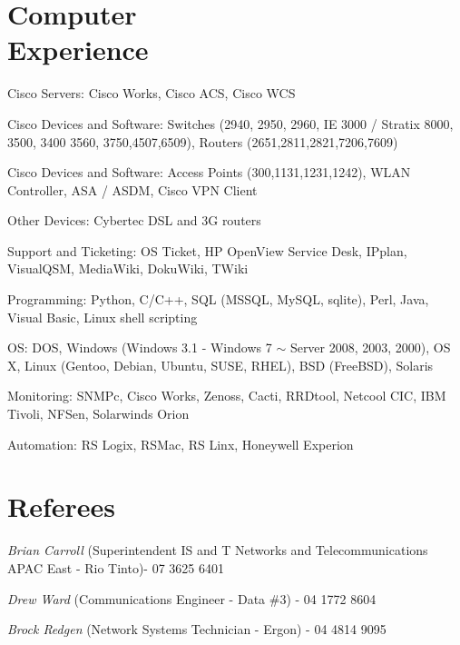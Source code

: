 \documentclass[margin,line]{resume}
\begin{document}
\begin{resume}
    \section{\mysidestyle Computer\\Experience} 

    \begin{list2}
	\item Cisco Servers:  Cisco Works, Cisco ACS, Cisco WCS
	\item Cisco Devices and Software: Switches (2940, 2950, 2960, IE 3000 / Stratix 8000, 3500, 3400 3560, 3750,4507,6509), Routers (2651,2811,2821,7206,7609)
	\item Cisco Devices and Software: Access Points (300,1131,1231,1242), WLAN Controller, ASA / ASDM, Cisco VPN Client
        \item Other Devices: Cybertec DSL and 3G routers
        \item Support and Ticketing:  OS Ticket, HP OpenView Service Desk, IPplan, VisualQSM, MediaWiki, DokuWiki, TWiki
        \item Programming: Python, C/C++, SQL (MSSQL, MySQL, sqlite), Perl, Java, Visual Basic, Linux shell scripting
        \item OS: DOS, Windows (Windows 3.1 - Windows 7 \ensuremath{\sim} Server 2008, 2003, 2000), OS X, Linux (Gentoo, Debian, Ubuntu, SUSE, RHEL), BSD (FreeBSD), Solaris
        \item Monitoring: SNMPc, Cisco Works, Zenoss, Cacti, RRDtool, Netcool CIC, IBM Tivoli, NFSen, Solarwinds Orion 
        \item Automation: RS Logix, RSMac, RS Linx, Honeywell Experion 
    \end{list2}

    \section{\mysidestyle Referees} 

    \begin{list2}
    \item {\sl Brian Carroll} (Superintendent IS and T Networks and Telecommunications APAC East - Rio Tinto)- 07 3625 6401
    \item {\sl Drew Ward} (Communications Engineer - Data \#3) - 04 1772 8604
    \item {\sl Brock Redgen} (Network Systems Technician - Ergon) - 04 4814 9095
    \end{list2}


\end{resume}
\end{document}
